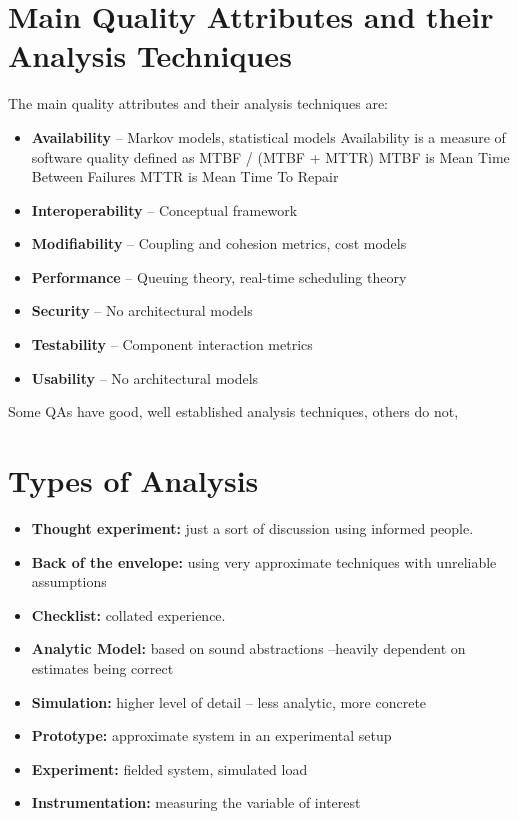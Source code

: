 \documentclass[a4paper]{report}
\begin{document}
\section{Main Quality Attributes and their Analysis Techniques}
The main quality attributes and their analysis techniques are:
\begin{itemize}

\item \textbf{Availability} – Markov models, statistical models \newline
Availability is a measure of software quality defined as MTBF / (MTBF + MTTR)
MTBF is Mean Time Between Failures
MTTR is Mean Time To Repair 

\item \textbf{Interoperability} – Conceptual framework 

\item \textbf{Modifiability} – Coupling and cohesion metrics, cost models

\item \textbf{Performance} – Queuing theory, real-time scheduling theory

\item \textbf{Security} – No architectural models

\item \textbf{Testability} – Component interaction metrics

\item \textbf{Usability} – No architectural models
\end{itemize}

Some QAs have good, well established analysis techniques, others do not,

\section{Types of Analysis}
\begin{itemize}
\item
\textbf{Thought experiment:} just a sort of discussion using informed people. 

\item
\textbf{Back of the envelope:} using very approximate techniques with unreliable assumptions

\item
\textbf{Checklist:} collated experience.

\item
\textbf{Analytic Model:} based on sound abstractions –heavily dependent on estimates being correct

\item
\textbf{Simulation:} higher level of detail – less analytic, more concrete 

\item
\textbf{Prototype:} approximate system in an experimental setup

\item
\textbf{Experiment:} fielded system, simulated load 

\item
\textbf{Instrumentation:} measuring the variable of interest
\end{itemize}
\end{document}
